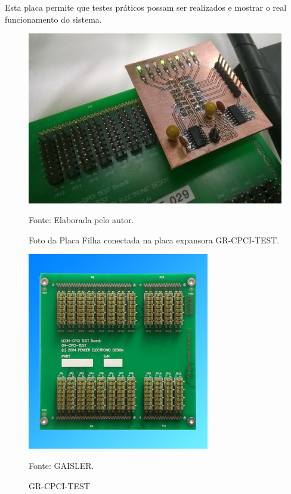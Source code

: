 Esta placa permite que testes práticos possam ser realizados e mostrar o real funcionamento do sistema.

\begin{figure}[!htb]
	\centering
	\caption{Foto da Placa Filha conectada na placa expansora GR-CPCI-TEST.}
	\includegraphics[scale = .4]{Imagens/PlacaFilha}
	
	Fonte: Elaborada pelo autor.
	
	\label{PlacaFilha}
\end{figure}

\begin{figure}[!htb]
	\centering
	\caption{GR-CPCI-TEST}
	\includegraphics[scale = .9]{Imagens/cpci-test}
	
	Fonte: GAISLER.
	
	\label{cpci-test}
\end{figure}

